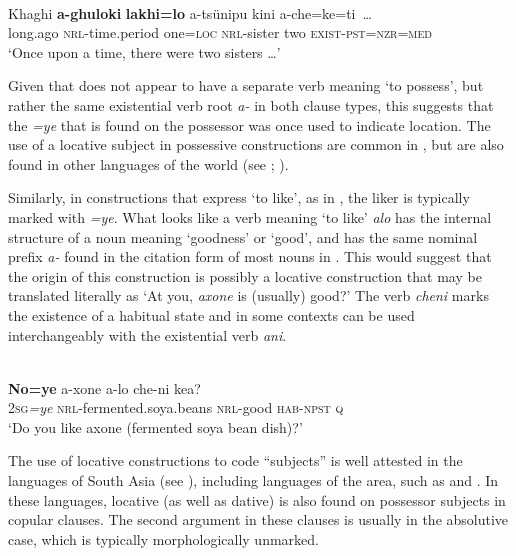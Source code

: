 \documentclass[output=paper]{LSP/langsci}
\begin{document}
\ea\label{13-te-ex:31}
\\
\gll Khaghi \textbf{a-ghuloki} \textbf{lakhi=lo} a-tsünipu kini a-che=ke=ti~…\\
long.ago \textsc{nrl}-time.period one=\textsc{loc} \textsc{nrl}-sister two \textsc{exist}-\textsc{pst}=\textsc{nzr}=\textsc{med}\\
\glt ‘Once upon a time, there were two sisters …’ 
\z

Given that  does not appear to have a separate verb meaning ‘to possess’, but rather the same existential verb root \textit{a-} in both clause types, this suggests that the \textit{=ye} that is found on the possessor was once used to indicate location. 
The use of a locative subject in possessive constructions are common in , but are also found in other languages of the world (see \citealt{Clark1978Locationals}; \citealt{Stassen2013Predicative}).

Similarly, in constructions that express ‘to like’, as in , the liker is typically marked with \textit{=ye}. What looks like a verb meaning ‘to like’ \textit{alo} has the internal structure of a noun meaning ‘goodness’ or ‘good’, and has the same nominal prefix \textit{a-} found in the citation form of most nouns in . This would suggest that the origin of this construction is possibly a locative construction that may be translated literally as ‘At you, \textit{axone} is (usually) good?’ The verb \textit{cheni} marks the existence of a habitual state and in some contexts can be used interchangeably with the existential verb \textit{ani}.

\ea\label{13-te-ex:32}
\\
\gll \textbf{No=ye} a-xone a-lo che-ni kea?\\
\textsc{2sg}\textit{=ye} \textsc{nrl}-fermented.soya.beans \textsc{nrl}-good \textsc{hab}-\textsc{npst} \textsc{q}\\
\glt ‘Do you like axone (fermented soya bean dish)?’
\z

The use of locative constructions to code  “subjects” is well attested in the languages of South Asia (see \citealt{Vermaetal1990Experiencer}), including  languages of the area, such as  \citep[108]{Chelliah1997Grammar} and  \citep[142]{Andvik2010Grammar}. In these languages, locative (as well as dative)  is also found on possessor subjects in copular clauses. The second argument in these clauses is usually in the absolutive case, which is typically morphologically unmarked.
\end{document}
